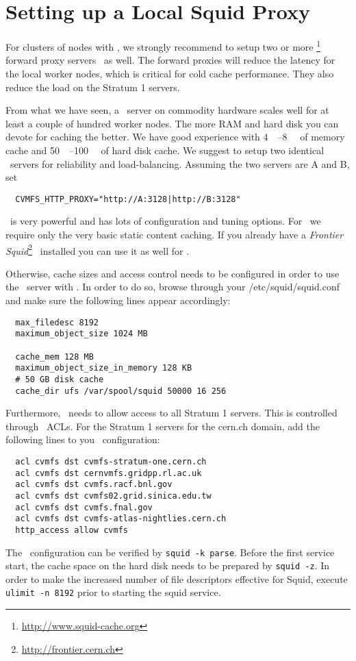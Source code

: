 \chapter{Setting up a Local Squid Proxy}
\label{sct:squid}

For clusters of nodes with \cvmfs, we strongly recommend to setup two or more \squid\footnote{\url{http://www.squid-cache.org}} forward proxy servers~\cite{squid99, bloomsquid00} as well.
The forward proxies will reduce the latency for the local worker nodes, which is critical for cold cache performance. 
They also reduce the load on the Stratum 1 servers.

From what we have seen, a \squid\ server on commodity hardware scales well for at least a couple of hundred worker nodes.
The more RAM and hard disk you can devote for caching the better.
We have good experience with \SIrange{4}{8}{\giga\byte} of memory cache and \SIrange{50}{100}{\giga\byte} of hard disk cache.
We suggest to setup two identical \squid\ servers for reliability and load-balancing.
Assuming the two servers are A and B, set
\begin{verbatim}
  CVMFS_HTTP_PROXY="http://A:3128|http://B:3128"
\end{verbatim}

\squid\ is very powerful and has lots of configuration and tuning options.
For \cvmfs\ we require only the very basic static content caching.
If you already have a \emph{Frontier Squid}\footnote{\url{http://frontier.cern.ch}}~\cite{frontier08, frontier10} installed you can use it as well for \cvmfs.

Otherwise, cache sizes and access control needs to be configured in order to use the \squid\ server with \cvmfs.
In order to do so, browse through your /etc/squid/squid.conf and make sure the following lines appear accordingly:
\begin{verbatim}
  max_filedesc 8192
  maximum_object_size 1024 MB

  cache_mem 128 MB
  maximum_object_size_in_memory 128 KB
  # 50 GB disk cache
  cache_dir ufs /var/spool/squid 50000 16 256
\end{verbatim}

Furthermore, \squid\ needs to allow access to all Stratum 1 servers.
This is controlled through \squid\ ACLs.
For the Stratum 1 servers for the cern.ch domain, add the following lines to you \squid\ configuration:
\begin{verbatim}
  acl cvmfs dst cvmfs-stratum-one.cern.ch
  acl cvmfs dst cernvmfs.gridpp.rl.ac.uk
  acl cvmfs dst cvmfs.racf.bnl.gov
  acl cvmfs dst cvmfs02.grid.sinica.edu.tw
  acl cvmfs dst cvmfs.fnal.gov
  acl cvmfs dst cvmfs-atlas-nightlies.cern.ch
  http_access allow cvmfs
\end{verbatim}

The \squid\ configuration can be verified by \texttt{squid -k parse}.
Before the first service start, the cache space on the hard disk needs to be prepared by \texttt{squid -z}.
In order to make the increased number of file descriptors effective for Squid, execute \texttt{ulimit -n 8192} prior to starting the squid service.
